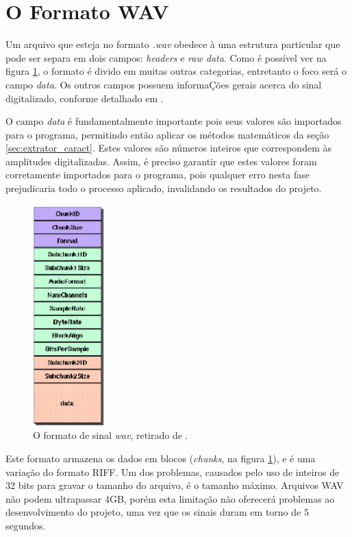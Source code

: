 \documentclass[a4paper,12pt,oneside]{report}
\begin{document}
\section{O Formato WAV}
\label{formato_wav}
\hspace*{+15pt} Um arquivo que esteja no formato \textit{.wav} obedece \`{a} uma estrutura particular que pode ser separa em dois campos: \emph{headers} e \emph{raw data}. Como \'{e} poss\'{i}vel ver na figura \ref{fig:wave_file}, o formato \'{e} divido em muitas outras categorias, entretanto o foco ser\'{a} o campo \emph{data}. Os outros campos possuem informa\c{C}\~{o}es gerais acerca do sinal digitalizado, conforme detalhado em \cite{formato_wave_completo}.
\\
\par O campo \emph{data} \'{e} fundamentalmente importante pois seus valores s\~{a}o importados para o programa, permitindo ent\~{a}o aplicar os m\'{e}todos matem\'{a}ticos da se\c{c}\~{a}o \ref{sec:extrator_caract}. Estes valores s\~{a}o n\'{u}meros inteiros que correspondem \`{a}s amplitudes digitalizadas. Assim, \'{e} preciso garantir que estes valores foram corretamente importados para o programa, pois qualquer erro nesta fase prejudicaria todo o processo aplicado, invalidando os resultados do projeto. 
\begin{figure}
\centering
\includegraphics[width=80pt]{wave_file}
\caption{O formato de sinal \emph{wav}, retirado de \cite{figura_wave}.}
\label{fig:wave_file}
\end{figure}
\par Este formato armazena os dados em blocos (\emph{chunks}, na figura \ref{fig:wave_file}), e \'{e} uma varia\c{c}\~{a}o do formato RIFF. Um dos problemas, causados pelo uso de inteiros de 32 bits para gravar o tamanho do arquivo, \'{e} o tamanho m\'{a}ximo. Arquivos WAV n\~{a}o podem ultrapassar 4GB, por\'{e}m esta limita\c{c}\~{a}o n\~{a}o oferecer\'{a} problemas ao desenvolvimento do projeto, uma vez que os sinais duram em torno de 5 segundos. 
\end{document}
